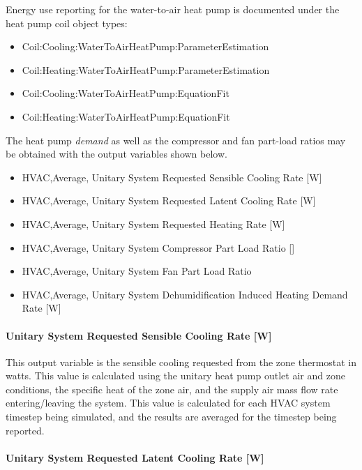 Energy use reporting for the water-to-air heat pump is documented under the heat pump coil object types:

\begin{itemize}
\item
  Coil:Cooling:WaterToAirHeatPump:ParameterEstimation
\item
  Coil:Heating:WaterToAirHeatPump:ParameterEstimation
\item
  Coil:Cooling:WaterToAirHeatPump:EquationFit
\item
  Coil:Heating:WaterToAirHeatPump:EquationFit
\end{itemize}

The heat pump \emph{demand} as well as the compressor and fan part-load ratios may be obtained with the output variables shown below.

\begin{itemize}
\item
  HVAC,Average, Unitary System Requested Sensible Cooling Rate {[}W{]}
\item
  HVAC,Average, Unitary System Requested Latent Cooling Rate {[}W{]}
\item
  HVAC,Average, Unitary System Requested Heating Rate {[}W{]}
\item
  HVAC,Average, Unitary System Compressor Part Load Ratio {[]}
\item
  HVAC,Average, Unitary System Fan Part Load Ratio
\item
  HVAC,Average, Unitary System Dehumidification Induced Heating Demand Rate {[}W{]}
\end{itemize}

\paragraph{Unitary System Requested Sensible Cooling Rate {[}W{]}}\label{unitary-system-requested-sensible-cooling-rate-w-1}

This output variable is the sensible cooling requested from the zone thermostat in watts. This value is calculated using the unitary heat pump outlet air and zone conditions, the specific heat of the zone air, and the supply air mass flow rate entering/leaving the system. This value is calculated for each HVAC system timestep being simulated, and the results are averaged for the timestep being reported.

\paragraph{Unitary System Requested Latent Cooling Rate {[}W{]}}\label{unitary-system-requested-latent-cooling-rate-w-1}

